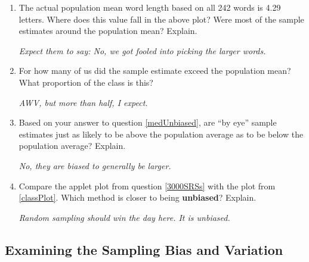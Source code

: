 \begin{enumerate}
      \item  The actual population mean word length based on all 242
        words is 4.29 letters. Where does this value fall in the
        above plot? Were most of the sample estimates around the
        population mean? Explain. 
\begin{students}
  \vspace{1cm}
\end{students}    
\begin{key}
   {\it Expect them to say: No, we got fooled into picking the larger words.}
\end{key}     

     \item\label{medUnbiased} For how many of us did the sample
       estimate exceed the population mean? What proportion of the
       class is this?        
\begin{students}
  \vspace{1cm}
\end{students}    
\begin{key}
   {\it AWV, but more than half, I expect.}
\end{key}

     \item Based on your answer to question \ref{medUnbiased}, are 
       ``by eye'' sample estimates just as likely to be above the population
       average as  to be below the population average?  Explain.      
\begin{students}
  \vspace{1cm}
\end{students}    
\begin{key}
   {\it No, they are biased to generally be larger.}
\end{key}

     \item Compare the applet plot from question \ref{3000SRSs} with
       the plot from \ref{classPlot}.  Which method is closer to being {\bf
         unbiased}? Explain.
\begin{students}
  \vspace{3cm}
\end{students}    
\begin{key}
   {\it  Random sampling should win the day here.  It is unbiased.}
\end{key}
     
     \end{enumerate}
     
       \subsection{ Examining the Sampling Bias and Variation}

